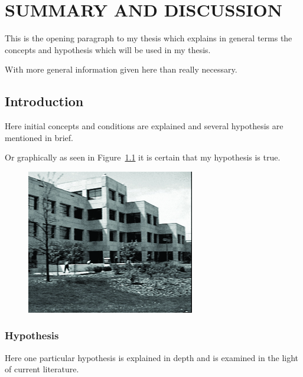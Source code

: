 \chapter{SUMMARY AND DISCUSSION}

This is the opening paragraph to my thesis which
explains in general terms the concepts and hypothesis
which will be used in my thesis.

With more general information given here than really
necessary.

\section{Introduction}

Here initial concepts and conditions are explained and
several hypothesis are mentioned in brief.

Or graphically as seen in Figure~\ref{mgraph2}
it is certain that my hypothesis is true.


\begin{figure}[H] \centering %
\includegraphics[alt={This is alt text}]{Images/dc5}

\label{mgraph2}
\end{figure}

\subsection{Hypothesis}

Here one particular hypothesis is explained in depth
and is examined in the light of current literature.

